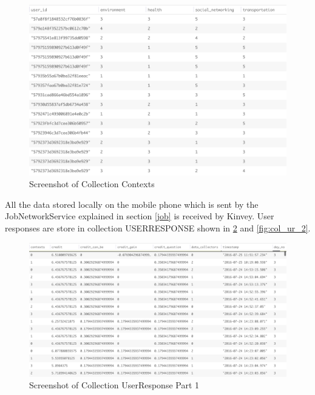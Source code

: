 \begin{figure}[ht!]
\centering
\includegraphics[width=\textwidth,keepaspectratio,height=0.6\textwidth]{./images/collection_context_cat}
\caption{Screenshot of Collection Contexts}
\label{fig:col_c}
\end{figure}

All the data stored locally on the mobile phone which is sent by the JobNetworkService explained in section \ref{job} is received by Kinvey.
User responses are store in collection USERRESPONSE shown in \ref{fig:col_ur_1} and \ref{fig:col_ur_2}.


\begin{figure}[ht!]
\centering
\includegraphics[width=\textwidth,keepaspectratio, height=0.6\textwidth]{./images/collection_ur_1}
\caption{Screenshot of Collection UserResponse Part 1}
\label{fig:col_ur_1}
\end{figure}

